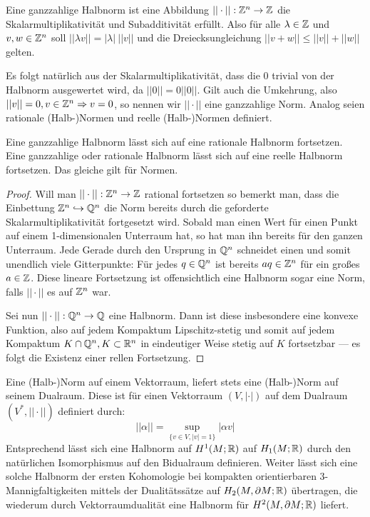     \begin{defn}
    	Eine ganzzahlige Halbnorm ist eine Abbildung $||\cdot||: \mathbb{Z}^n \to \mathbb{Z}$  die Skalarmultiplikativität und Subadditivität erfüllt. Also für alle $\lambda \in \mathbb{Z}$ und $v,w\in \mathbb{Z}^n$ soll $||\lambda v||=\vert\lambda\vert~||v||$ und die Dreiecksungleichung $||v+w||\le ||v||+||w||$ gelten.
    \end{defn}
    Es folgt natürlich aus der Skalarmultiplikativität, dass die $0$ trivial von der Halbnorm ausgewertet wird, da $||0|| = 0||0||$. Gilt auch die Umkehrung, also $||v||=0, v\in \mathbb{Z}^n \Rightarrow v=0$, so nennen wir $||\cdot ||$ eine ganzzahlige Norm. Analog seien rationale (Halb-)Normen und reelle (Halb-)Normen definiert. 
    \begin{lem}
    \label{lem:fortsetzungnorm}
    	Eine ganzzahlige Halbnorm lässt sich auf eine rationale Halbnorm fortsetzen. Eine ganzzahlige oder rationale Halbnorm lässt sich auf eine reelle Halbnorm fortsetzen. Das gleiche gilt für Normen.
    \end{lem}
    \begin{proof}
    	Will man $||\cdot||:  \mathbb{Z}^n \to \mathbb{Z}$ rational fortsetzen so bemerkt man, dass die Einbettung $\mathbb{Z}^n \hookrightarrow \mathbb{Q}^n$ die Norm bereits durch die geforderte Skalarmultiplikativität fortgesetzt wird. Sobald man einen Wert für einen Punkt auf einem 1-dimensionalen Unterraum hat, so hat man ihn bereits für den ganzen Unterraum. Jede Gerade durch den Ursprung in $\mathbb{Q}^n$ schneidet einen und somit unendlich viele Gitterpunkte: Für jedes $q \in \mathbb{Q}^n$ ist bereits $aq \in \mathbb{Z}^n$ für ein großes $a\in \mathbb{Z}$. Diese lineare Fortsetzung ist offensichtlich eine Halbnorm sogar eine Norm, falls $||\cdot||$ es auf $\mathbb{Z}^n$ war.

    	Sei nun $||\cdot||: \mathbb{Q}^n \to \mathbb{Q}$ eine Halbnorm. Dann ist diese insbesondere eine konvexe Funktion, also auf jedem Kompaktum Lipschitz-stetig und somit auf jedem Kompaktum $K\cap \mathbb{Q}^n, K\subset \mathbb{R}^n$ in eindeutiger Weise stetig auf $K$ fortsetzbar --- es folgt die Existenz einer rellen Fortsetzung.
    \end{proof}



    \begin{bem}
        Eine (Halb-)Norm auf einem Vektorraum, liefert stets eine (Halb-)Norm auf seinem Dualraum. Diese ist für einen Vektorraum $(V,|\cdot|)$ auf dem Dualraum $(V^*,||\cdot||)$ definiert durch:
        \[
             ||\alpha||= \sup_{\{v\in V, |v|=1\}} |\alpha v|
         \] 
         Entsprechend lässt sich eine Halbnorm auf $H^1(M;\mathbb{R})$ auf $H_1(M;\mathbb{R})$ durch den natürlichen Isomorphismus auf den Bidualraum definieren. Weiter lässt sich eine solche Halbnorm der ersten Kohomologie bei kompakten orientierbaren 3-Mannigfaltigkeiten mittels der Dualitätssätze auf $H_2(M,\partial M;\mathbb{R})$ übertragen, die wiederum durch Vektorraumdualität eine Halbnorm für $H^2(M,\partial M;\mathbb{R})$ liefert.
    \end{bem}


